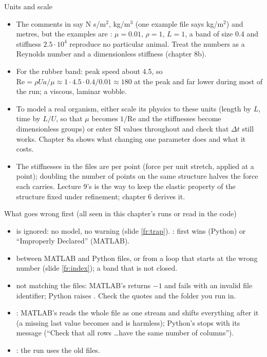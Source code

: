 \documentclass[aspectratio=169,11pt]{beamer}
\begin{document}
\begin{frame}{Units and scale}
\label{fr:units}
\small
\begin{itemize}
  \item The comments in  say N s/m$^2$, kg/m$^3$ (one example file says kg/m$^2$) and metres, but the examples are : $\mu = 0.01$, $\rho = 1$, $L = 1$, a band of size 0.4 and stiffness $2.5 \cdot 10^4$ reproduce no particular animal. Treat the numbers as a Reynolds number and a dimensionless stiffness (chapter 8b).
  \item For the rubber band: peak speed about 4.5, so $\mathrm{Re} = \rho U a/\mu \approx 1 \cdot 4.5 \cdot 0.4 / 0.01 \approx 180$ at the peak and far lower during most of the run; a viscous, laminar wobble.
  \item To model a real organism, either scale its physics to these units (length by $L$, time by $L/U$, so that $\mu$ becomes $1/\mathrm{Re}$ and the stiffnesses become dimensionless groups) or enter SI values throughout and check that $\Delta t$ still works. Chapter 8a shows what changing one parameter does and what it costs.
  \item The stiffnesses in the files are per point (force per unit stretch, applied at a point); doubling the number of points on the same structure halves the force each carries. Lecture 9's  is the way to keep the elastic property of the structure fixed under refinement; chapter 6 derives it.
\end{itemize}
\end{frame}

\begin{frame}{What goes wrong first (all seen in this chapter's runs or read in the code)}
\label{fr:pitfalls}
\footnotesize
\begin{itemize}
  \item {} is ignored: no model, no warning (slide \ref{fr:trap}). : first wins (Python) or ``Improperly Declared'' (MATLAB).
  \item {} between MATLAB and Python files, or from a loop that starts at the wrong number (slide \ref{fr:index}); a band that is not closed.
  \item {} not matching the files: MATLAB's  returns $-1$ and  fails with an invalid file identifier; Python raises . Check the quotes and the folder you run in.
  \item {}: MATLAB's  reads the whole file as one stream and shifts everything after it (a missing last value becomes  and is harmless); Python's  stops with its message (``Check that all rows \ldots have the same number of columns'').
  \item {}: the run uses the old files.
\end{itemize}
\end{frame}
\end{document}
